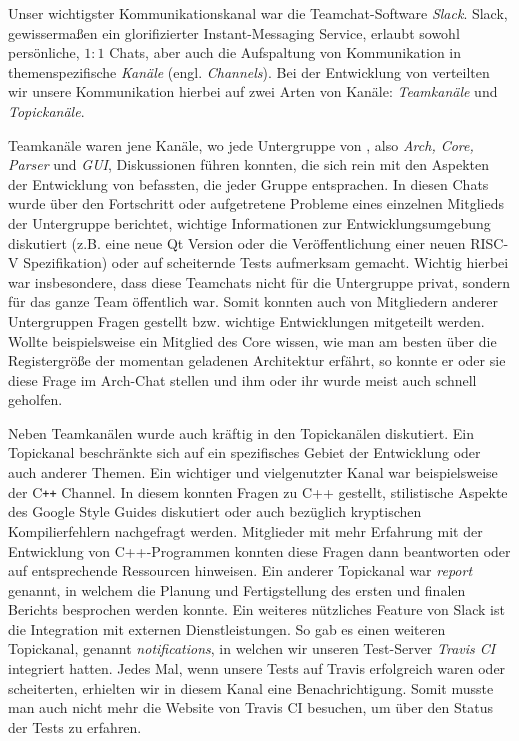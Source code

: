 Unser wichtigster Kommunikationskanal war die Teamchat-Software \emph{Slack}.
Slack, gewissermaßen ein glorifizierter Instant-Messaging Service, erlaubt
sowohl persönliche, $1:1$ Chats, aber auch die Aufspaltung von Kommunikation in
themenspezifische \emph{Kanäle} (engl. \emph{Channels}). Bei der Entwicklung von
\erasim{} verteilten wir unsere Kommunikation hierbei auf zwei Arten von Kanäle:
\emph{Teamkanäle} und \emph{Topickanäle}.

Teamkanäle waren jene Kanäle, wo jede Untergruppe von \erasim{}, also
\emph{Arch, Core, Parser} und \emph{GUI}, Diskussionen führen konnten, die sich
rein mit den Aspekten der Entwicklung von \erasim{} befassten, die jeder Gruppe
entsprachen. In diesen Chats wurde über den Fortschritt oder aufgetretene
Probleme eines einzelnen Mitglieds der Untergruppe berichtet, wichtige
Informationen zur Entwicklungsumgebung diskutiert (z.B. eine neue Qt Version
oder die Veröffentlichung einer neuen RISC-V Spezifikation) oder auf scheiternde
Tests aufmerksam gemacht. Wichtig hierbei war insbesondere, dass diese Teamchats
nicht für die Untergruppe privat, sondern für das ganze \erasim{} Team
öffentlich war. Somit konnten auch von Mitgliedern anderer Untergruppen Fragen
gestellt bzw. wichtige Entwicklungen mitgeteilt werden. Wollte beispielsweise
ein Mitglied des Core wissen, wie man am besten über die Registergröße der
momentan geladenen Architektur erfährt, so konnte er oder sie diese Frage im
Arch-Chat stellen und ihm oder ihr wurde meist auch schnell geholfen.

Neben Teamkanälen wurde auch kräftig in den Topickanälen diskutiert. Ein
Topickanal beschränkte sich auf ein spezifisches Gebiet der Entwicklung oder
auch anderer Themen. Ein wichtiger und vielgenutzter Kanal war beispielsweise
der C\texttt{++} Channel. In diesem konnten Fragen zu C++ gestellt, stilistische
Aspekte des Google Style Guides diskutiert oder auch bezüglich kryptischen
Kompilierfehlern nachgefragt werden. Mitglieder mit mehr Erfahrung mit der
Entwicklung von C++-Programmen konnten diese Fragen dann beantworten oder auf
entsprechende Ressourcen hinweisen. Ein anderer Topickanal war \emph{report}
genannt, in welchem die Planung und Fertigstellung des ersten und finalen
Berichts besprochen werden konnte. Ein weiteres nützliches Feature von Slack ist
die Integration mit externen Dienstleistungen. So gab es einen weiteren
Topickanal, genannt \emph{notifications}, in welchen wir unseren Test-Server
\emph{Travis CI} integriert hatten. Jedes Mal, wenn unsere Tests auf Travis
erfolgreich waren oder scheiterten, erhielten wir in diesem Kanal eine
Benachrichtigung. Somit musste man auch nicht mehr die Website von Travis CI
besuchen, um über den Status der Tests zu erfahren.

